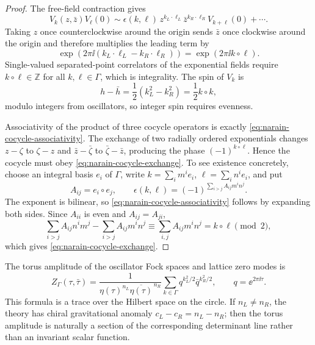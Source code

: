 \begin{proof}
The free-field contraction gives
\begin{equation}
  V_k(z,\bar z)V_\ell(0)
  \sim
  \epsilon(k,\ell)\,
  z^{k_L\cdot\ell_L}\bar z^{k_R\cdot\ell_R}
  V_{k+\ell}(0)+\cdots .
  \label{eq:narain-vertex-ope-leading}
\end{equation}
Taking \(z\) once counterclockwise around the origin sends
\(\bar z\) once clockwise around the origin and therefore multiplies the
leading term by
\[
  \exp\!\left(2\pi\ii(k_L\cdot\ell_L-k_R\cdot\ell_R)\right)
  =
  \exp(2\pi\ii k\circ\ell).
\]
Single-valued separated-point correlators of the exponential fields require
\(k\circ\ell\in\mathbb Z\) for all \(k,\ell\in\Gamma\), which is integrality.
The spin of \(V_k\) is
\[
  h-\bar h=\frac12(k_L^2-k_R^2)=\frac12 k\circ k ,
\]
modulo integers from oscillators, so integer spin requires evenness.

Associativity of the product of three cocycle operators is exactly
\eqref{eq:narain-cocycle-associativity}.  The exchange of two radially
ordered exponentials changes \(z-\zeta\) to \(\zeta-z\) and
\(\bar z-\bar\zeta\) to \(\bar\zeta-\bar z\), producing the phase
\((-1)^{k\circ\ell}\).  Hence the cocycle must obey
\eqref{eq:narain-cocycle-exchange}.  To see existence concretely, choose an
integral basis \(e_i\) of \(\Gamma\), write
\(k=\sum_i m^ie_i\), \(\ell=\sum_i n^ie_i\), and put
\begin{equation}
  A_{ij}=e_i\circ e_j,
  \qquad
  \epsilon(k,\ell)
  =
  (-1)^{\sum_{i>j}A_{ij}m^in^j}.
  \label{eq:narain-explicit-cocycle}
\end{equation}
The exponent is bilinear, so
\eqref{eq:narain-cocycle-associativity} follows by expanding both sides.
Since \(A_{ii}\) is even and \(A_{ij}=A_{ji}\),
\[
  \sum_{i>j}A_{ij}n^im^j-\sum_{i>j}A_{ij}m^in^j
  \equiv
  \sum_{i,j}A_{ij}m^in^j
  =
  k\circ\ell
  \pmod 2,
\]
which gives \eqref{eq:narain-cocycle-exchange}.
\end{proof}

The torus amplitude of the oscillator Fock spaces and lattice zero modes is
\begin{equation}
  Z_\Gamma(\tau,\bar\tau)
  =
  \frac{1}{\eta(\tau)^{n_L}\overline{\eta(\tau)}^{\,n_R}}
  \sum_{k\in\Gamma}
  q^{k_L^2/2}\bar q^{k_R^2/2},
  \qquad
  q=\ee^{2\pi\ii\tau}.
  \label{eq:narain-partition-function}
\end{equation}
This formula is a trace over the Hilbert space on the circle.  If
\(n_L\ne n_R\), the theory has chiral gravitational anomaly
\(c_L-c_R=n_L-n_R\); then the torus amplitude is naturally a section of the
corresponding determinant line rather than an invariant scalar function.

